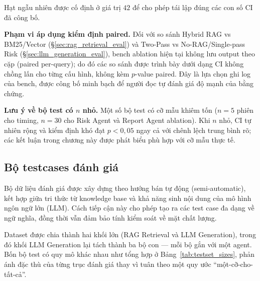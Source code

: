 Hạt ngẫu nhiên được cố định ở giá trị $42$ để cho phép tái lập đúng các con số CI đã công bố.

\textbf{Phạm vi áp dụng kiểm định paired.} Đối với so sánh Hybrid RAG vs BM25/Vector (\S\ref{sec:rag_retrieval_eval}) và Two-Pass vs No-RAG/Single-pass Risk (\S\ref{sec:llm_generation_eval}), bench ablation hiện tại không lưu output theo cặp (paired per-query); do đó các so sánh được trình bày dưới dạng CI không chồng lấn cho từng cấu hình, không kèm $p$-value paired. Đây là lựa chọn ghi log của bench, được công bố minh bạch để người đọc tự đánh giá độ mạnh của bằng chứng.

\textbf{Lưu ý về bộ test có $n$ nhỏ.} Một số bộ test có cỡ mẫu khiêm tốn ($n=5$ phiên cho timing, $n=30$ cho Risk Agent và Report Agent ablation). Khi $n$ nhỏ, CI tự nhiên rộng và kiểm định khó đạt $p<0{,}05$ ngay cả với chênh lệch trung bình rõ; các kết luận trong chương này được phát biểu phù hợp với cỡ mẫu thực tế.


\subsection{Bộ testcases đánh giá}

Bộ dữ liệu đánh giá được xây dựng theo hướng bán tự động (semi-automatic), kết hợp giữa tri thức từ knowledge base và khả năng sinh nội dung của mô hình ngôn ngữ lớn (LLM). Cách tiếp cận này cho phép tạo ra các test case đa dạng về ngữ nghĩa, đồng thời vẫn đảm bảo tính kiểm soát về mặt chất lượng.

Dataset được chia thành hai khối lớn (RAG Retrieval và LLM Generation), trong đó khối LLM Generation lại tách thành ba bộ con --- mỗi bộ gắn với một agent. Bốn bộ test có quy mô khác nhau như tổng hợp ở Bảng~\ref{tab:testset_sizes}, phản ánh đặc thù của từng trục đánh giá thay vì tuân theo một quy ước ``một-cỡ-cho-tất-cả''.

